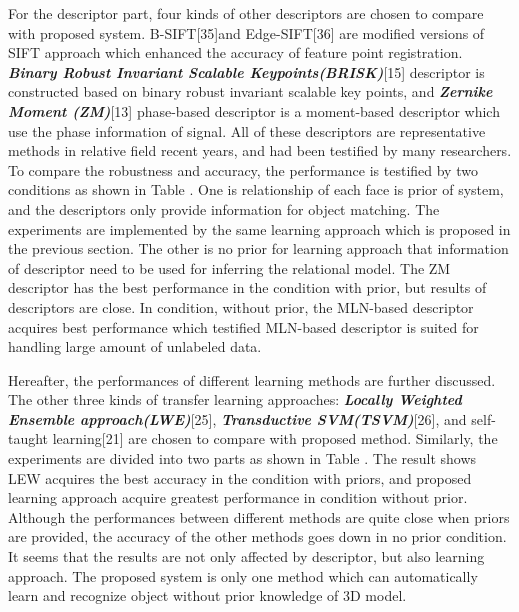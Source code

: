 \documentclass[journal]{IEEEtran}
\begin{document}
For the descriptor part, four kinds of other descriptors are chosen to compare with proposed system. B-SIFT[35]and Edge-SIFT[36] are modified versions of SIFT approach which enhanced the accuracy of feature point registration.  \textbf{\textit{Binary Robust Invariant Scalable Keypoints(BRISK)}}[15] descriptor is constructed based on binary robust invariant scalable key points, and \textbf{\textit{Zernike Moment (ZM)}}[13] phase-based descriptor is a moment-based descriptor which use the phase information of signal. All of these descriptors are representative methods in relative field recent years, and had been testified by many researchers. To compare the robustness and accuracy, the performance is testified by two conditions as shown in Table \uppercase\expandafter{}. One is relationship of each face is prior of system, and the descriptors only provide information for object matching. The experiments are implemented by the same learning approach which is proposed in the previous section. The other is no prior for learning approach that information of descriptor need to be used for inferring the relational model. The ZM descriptor has the best performance in the condition with prior, but results of descriptors are close. In condition, without prior, the MLN-based descriptor acquires best performance which testified MLN-based descriptor is suited for handling large amount of unlabeled data. 

Hereafter, the performances of different learning methods are further discussed. The other three kinds of transfer learning approaches: \textbf{\textit{Locally Weighted Ensemble approach(LWE)}}[25], \textbf{\textit{Transductive SVM(TSVM)}}[26], and self-taught learning[21] are chosen to compare with proposed method. Similarly, the experiments are divided into two parts as shown in Table \uppercase\expandafter{}. The result shows LEW acquires the best accuracy in the condition with priors, and proposed learning approach acquire greatest performance in condition without prior. Although the performances between different methods are quite close when priors are provided, the accuracy of the other methods goes down in no prior condition. It seems that the results are not only affected by descriptor, but also learning approach. The proposed system is only one method which can automatically learn and recognize object without prior knowledge of 3D model. 

\newcommand{\tabincell}[2]{\begin{tabular}{@{}#1@{}}#2\end{tabular}}
\end{document}
